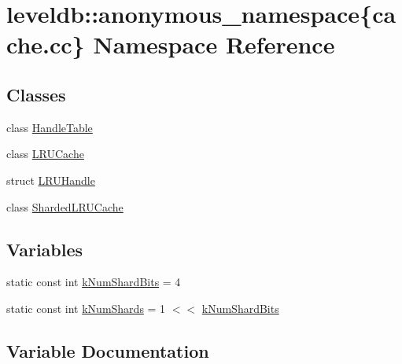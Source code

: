 \hypertarget{namespaceleveldb_1_1anonymous__namespace_02cache_8cc_03}{}\section{leveldb\+:\+:anonymous\+\_\+namespace\{cache.\+cc\} Namespace Reference}
\label{namespaceleveldb_1_1anonymous__namespace_02cache_8cc_03}
\subsection*{Classes}
\begin{DoxyCompactItemize}
\item 
class \hyperlink{classleveldb_1_1anonymous__namespace_02cache_8cc_03_1_1_handle_table}{Handle\+Table}
\item 
class \hyperlink{classleveldb_1_1anonymous__namespace_02cache_8cc_03_1_1_l_r_u_cache}{L\+R\+U\+Cache}
\item 
struct \hyperlink{structleveldb_1_1anonymous__namespace_02cache_8cc_03_1_1_l_r_u_handle}{L\+R\+U\+Handle}
\item 
class \hyperlink{classleveldb_1_1anonymous__namespace_02cache_8cc_03_1_1_sharded_l_r_u_cache}{Sharded\+L\+R\+U\+Cache}
\end{DoxyCompactItemize}
\subsection*{Variables}
\begin{DoxyCompactItemize}
\item 
static const int \hyperlink{namespaceleveldb_1_1anonymous__namespace_02cache_8cc_03_aa90d7390dc00417e1d35e7a6f58773a6}{k\+Num\+Shard\+Bits} = 4
\item 
static const int \hyperlink{namespaceleveldb_1_1anonymous__namespace_02cache_8cc_03_aca0255908fd5069b4420e4f02d25bd1b}{k\+Num\+Shards} = 1 $<$$<$ \hyperlink{namespaceleveldb_1_1anonymous__namespace_02cache_8cc_03_aa90d7390dc00417e1d35e7a6f58773a6}{k\+Num\+Shard\+Bits}
\end{DoxyCompactItemize}


\subsection{Variable Documentation}
\hypertarget{namespaceleveldb_1_1anonymous__namespace_02cache_8cc_03_aa90d7390dc00417e1d35e7a6f58773a6}{}

